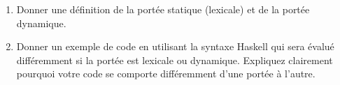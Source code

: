 \begin{Exercise}
  
\begin{enumerate}
\item Donner une définition de la portée statique (lexicale) et de la portée
dynamique.

\item 
Donner un exemple de code en utilisant la syntaxe Haskell qui sera
évalué différemment si la portée est lexicale ou dynamique. Expliquez
clairement pourquoi votre code se comporte différemment d'une portée à
l'autre.
\end{enumerate}
\end{Exercise}